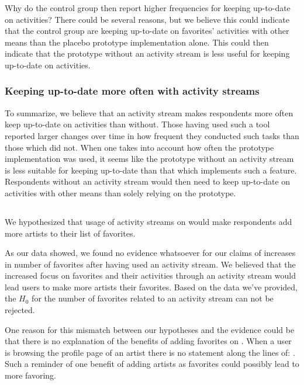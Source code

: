 Why do the control group then report higher frequencies for keeping up-to-date
on activities? There could be several reasons, but we believe this could
indicate that the control group are keeping up-to-date on favorites'
activities with other means than the placebo prototype implementation alone.
This could then indicate that the prototype without an activity stream is less
useful for keeping up-to-date on activities.

\subsubsection{Keeping up-to-date more often with activity streams}

To summarize, we believe that an activity stream makes respondents
more often keep up-to-date on activities than without. Those having used such
a tool reported larger changes over time in how frequent they conducted such
tasks than those which did not. When one takes into account how often the
prototype implementation was used, it seems like the prototype without
an activity stream is less suitable for keeping up-to-date than that which
implements such a feature. Respondents without an activity stream would
then need to keep up-to-date on activities with other means than solely
relying on the prototype.

\subsection{%
}

We hypothesized that usage of activity streams on \urort{} would
make respondents add more artists to their list of favorites.

As our data%
showed, we found no evidence whatsoever for our claims of increases in
number of favorites after having used an activity stream.
We believed that the increased focus on favorites and their activities through
an activity stream would lead users to make more artists their favorites.
Based on the data we've provided, the $H_0$ for the number of favorites
related to an activity stream can not be rejected.

One reason for this mismatch between our hypotheses and the evidence could be
that there is no explanation of the benefits of adding favorites on \urort{}.
When a user is browsing the profile page of an artist there is no statement
along the lines of: . Such a reminder of one benefit of adding
artists as favorites could possibly lead to more favoring.


